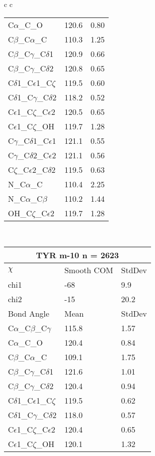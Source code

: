\begin{longtable}{ c c }
\begin{tabular}{ l l l }
  C$\alpha$\_C\_O & 120.6 & 0.80\\
  C$\beta$\_C$\alpha$\_C & 110.3 & 1.25\\
  C$\beta$\_C$\gamma$\_C$\delta$1 & 120.9 & 0.66\\
  C$\beta$\_C$\gamma$\_C$\delta$2 & 120.8 & 0.65\\
  C$\delta$1\_C$\epsilon$1\_C$\zeta$ & 119.5 & 0.60\\
  C$\delta$1\_C$\gamma$\_C$\delta$2 & 118.2 & 0.52\\
  C$\epsilon$1\_C$\zeta$\_C$\epsilon$2 & 120.5 & 0.65\\
  C$\epsilon$1\_C$\zeta$\_OH & 119.7 & 1.28\\
  C$\gamma$\_C$\delta$1\_C$\epsilon$1 & 121.1 & 0.55\\
  C$\gamma$\_C$\delta$2\_C$\epsilon$2 & 121.1 & 0.56\\
  C$\zeta$\_C$\epsilon$2\_C$\delta$2 & 119.5 & 0.63\\
  N\_C$\alpha$\_C & 110.4 & 2.25\\
  N\_C$\alpha$\_C$\beta$ & 110.2 & 1.44\\
  OH\_C$\zeta$\_C$\epsilon$2 & 119.7 & 1.28\\
  \bottomrule
  \end{tabular}
  \\
  \begin{tabular}{ l l l }
  \toprule
  \multicolumn{3}{c}{TYR \textbf{m-10} n = 2623} \\ \toprule
  $\chi$       & Smooth COM & StdDev \\ \midrule
  chi1 & -68 & 9.9 \\ 
  chi2 & -15 & 20.2 \\ \midrule
  Bond Angle   & Mean     & StdDev \\ \midrule
  C$\alpha$\_C$\beta$\_C$\gamma$ & 115.8 & 1.57\\
  C$\alpha$\_C\_O & 120.4 & 0.84\\
  C$\beta$\_C$\alpha$\_C & 109.1 & 1.75\\
  C$\beta$\_C$\gamma$\_C$\delta$1 & 121.6 & 1.01\\
  C$\beta$\_C$\gamma$\_C$\delta$2 & 120.4 & 0.94\\
  C$\delta$1\_C$\epsilon$1\_C$\zeta$ & 119.5 & 0.62\\
  C$\delta$1\_C$\gamma$\_C$\delta$2 & 118.0 & 0.57\\
  C$\epsilon$1\_C$\zeta$\_C$\epsilon$2 & 120.4 & 0.65\\
  C$\epsilon$1\_C$\zeta$\_OH & 120.1 & 1.32\\

\end{tabular}
\end{longtable}
